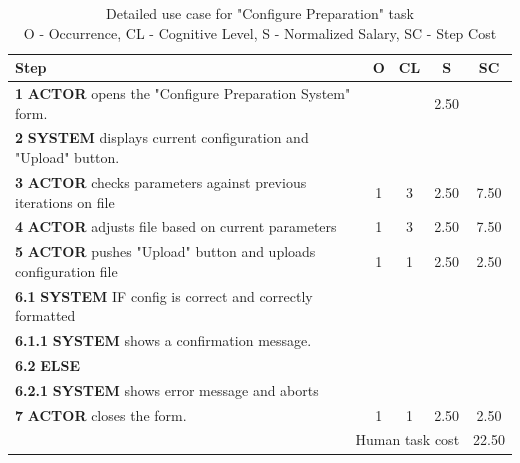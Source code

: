 \begin{table}[H]
\centering
\begin{tabularx}{\textwidth}{|X|c|c|c|c|}
\hline
\textbf{Step} & \textbf{O} & \textbf{CL} & \textbf{S} & \textbf{SC} \\
\hline
\textbf{1} \textbf{ACTOR} opens the "Configure Preparation System" form. &  & & 2.50 & \\
\hline
\textbf{2} \textbf{SYSTEM} displays current configuration and "Upload" button. & & & & \\
\hline
\textbf{3} \textbf{ACTOR} checks parameters against previous iterations on file & 1 & 3 & 2.50 & 7.50 \\
\hline
\textbf{4} \textbf{ACTOR} adjusts file based on current parameters & 1 & 3 & 2.50 & 7.50 \\
\hline
\textbf{5} \textbf{ACTOR} pushes "Upload" button and uploads configuration file & 1 & 1 & 2.50 & 2.50 \\
\hline
\textbf{6.1} \textbf{SYSTEM} IF config is correct and correctly formatted & & & & \\
\hline
\textbf{6.1.1} \textbf{SYSTEM} shows a confirmation message. & & & & \\
\hline
\textbf{6.2} \textbf{ELSE} & & & & \\
\hline
\textbf{6.2.1} \textbf{SYSTEM} shows error message and aborts & & & & \\
\hline
\textbf{7} \textbf{ACTOR} closes the form. & 1 & 1 & 2.50 & 2.50 \\
\hline
\multicolumn{4}{|r|}{Human task cost} & 22.50 \\
\hline
\end{tabularx}

\caption{Detailed use case for "Configure Preparation" task\\ 
O - Occurrence, CL - Cognitive Level, S - Normalized Salary, SC - Step Cost}
\label{table:configure_preparation_system}
\end{table}